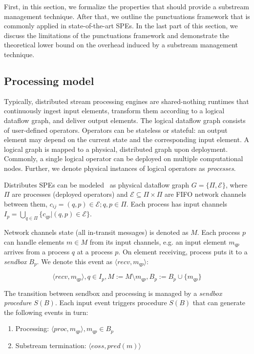 \label{fs-acker-preliminaries}

First, in this section, we formalize the properties that should provide a substream management technique. After that, we outline the punctuations framework that is commonly applied in state-of-the-art SPEs. In the last part of this section, we discuss the limitations of the punctuations framework and demonstrate the theoretical lower bound on the overhead induced by a substream management technique.

\subsection{Processing model}

Typically, distributed stream processing engines are shared-nothing runtimes that continuously ingest input elements, transform them according to a logical dataflow graph, and deliver output elements. The logical dataflow graph consists of user-defined operators. Operators can be stateless or stateful: an output element may depend on the current state and the corresponding input element. A logical graph is mapped to a physical, distributed graph upon deployment. Commonly, a single logical operator can be deployed on multiple computational nodes. Further, we denote physical instances of logical operators as {\em processes}.

Distributes SPEs can be modeled~\cite{carbone2018scalable} as physical dataflow graph $G=\{\Pi,\mathcal{E}\}$, where $\Pi$ are processes (deployed operators) and $\mathcal{E} \subseteq \Pi \times \Pi$ are FIFO network channels between them, $c_{ij}=(q,p)\in \mathcal{E}; q,p \in \Pi$. Each process has input channels $I_p = \bigcup_{q \in \Pi} \{c_{qp} | (q,p) \in \mathcal{E}\}$.

Network channels state (all in-transit messages) is denoted as $M$. Each process $p$ can handle elements $m\in M$ from its input channels, e.g. an input element $m_{qp}$ arrives from a process $q$ at a process $p$. On element receiving, process puts it to a {\em sendbox} $B_p$. We denote this event as $\langle recv,m_{qp}\rangle$:

$$\langle recv,m_{qp}\rangle, q\in I_p, M:=M\setminus{m_{qp}}, B_p:=B_p\cup\{m_{qp}\}$$

The transition between sendbox and processing is managed by a {\em sendbox procedure} $S(B)$. Each input event triggers procedure $S(B)$ that can generate the following events in turn:

\begin{enumerate}
    \item Processing: $\langle proc,m_{qp}\rangle, m_{qp}\in B_p$
    \item Substream termination: $\langle eoss,pred(m)\rangle$
\end{enumerate}

